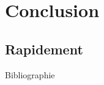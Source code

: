 \documentclass[unknownkeysallowed]{beamer}
\begin{document}
\section{Conclusion}
\label{sec:conclusion}



\subsection{Rapidement}
\label{sub:rapidement}



\begin{frame}{Bibliographie}
\printbibliography
\end{frame}
\end{document}
